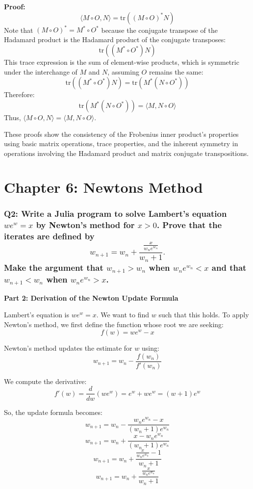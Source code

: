 \documentclass[8pt]{article}
\begin{document}
\textbf{Proof:}
\[
\langle M \circ O, N \rangle = \text{tr}((M \circ O)^*N)
\]
Note that \((M \circ O)^* = M^* \circ O^*\) because the conjugate transpose of the Hadamard product is the Hadamard product of the conjugate transposes:
\[
\text{tr}((M^* \circ O^*)N)
\]
This trace expression is the sum of element-wise products, which is symmetric under the interchange of \(M\) and \(N\), assuming \(O\) remains the same:
\[
\text{tr}((M^* \circ O^*)N) = \text{tr}(M^*(N \circ O^*))
\]
Therefore:
\[
\text{tr}(M^*(N \circ O^*)) = \langle M, N \circ O \rangle
\]
Thus, \( \langle M \circ O, N \rangle = \langle M, N \circ O \rangle \).

These proofs show the consistency of the Frobenius inner product's properties using basic matrix operations, trace properties, and the inherent symmetry in operations involving the Hadamard product and matrix conjugate transpositions.

\newpage
\section*{Chapter 6: Newtons Method}
\subsubsection*{Q2: Write a Julia program to solve Lambert’s equation \(we^w = x\) by Newton’s method for \(x > 0\). Prove that the iterates are defined by
\[ w_{n+1} = w_n + \frac{\frac{x}{w_n e^{w_n}}}{w_n + 1}. \]
Make the argument that \(w_{n+1} > w_n\) when \(w_n e^{w_n} < x\) and that \(w_{n+1} < w_n\) when \(w_n e^{w_n} > x\).}


\textbf{Part 2: Derivation of the Newton Update Formula}

Lambert's equation is \(we^w = x\). We want to find \(w\) such that this holds. To apply Newton's method, we first define the function whose root we are seeking:
\[ f(w) = we^w - x \]

Newton's method updates the estimate for \(w\) using:
\[ w_{n+1} = w_n - \frac{f(w_n)}{f'(w_n)} \]

We compute the derivative:
\[ f'(w) = \frac{d}{dw}(we^w) = e^w + we^w = (w + 1)e^w \]

So, the update formula becomes:
\[ w_{n+1} = w_n - \frac{w_n e^{w_n} - x}{(w_n + 1)e^{w_n}} \]
\[ w_{n+1} = w_n + \frac{x - w_n e^{w_n}}{(w_n + 1)e^{w_n}} \]
\[ w_{n+1} = w_n + \frac{\frac{x}{w_n e^{w_n}} - 1}{w_n + 1} \]
\[ w_{n+1} = w_n + \frac{\frac{x}{w_n e^{w_n}}}{w_n + 1} \]
\end{document}
